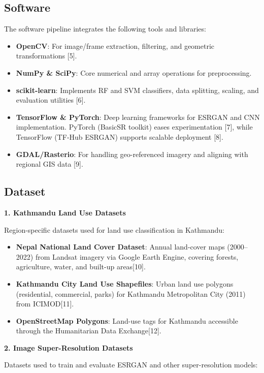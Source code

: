 \subsection{Software}
The software pipeline integrates the following tools and libraries:
\begin{itemize}
  \item \textbf{OpenCV}: For image/frame extraction, filtering, and geometric transformations [5].
  \item \textbf{NumPy \& SciPy}: Core numerical and array operations for preprocessing.
  \item \textbf{scikit-learn}: Implements RF and SVM classifiers, data splitting, scaling, and evaluation utilities [6].
  \item \textbf{TensorFlow \& PyTorch}: Deep learning frameworks for ESRGAN and CNN implementation. PyTorch (BasicSR toolkit) eases experimentation [7], while TensorFlow (TF‑Hub ESRGAN) supports scalable deployment [8].
  \item \textbf{GDAL/Rasterio}: For handling geo-referenced imagery and aligning with regional GIS data [9].
\end{itemize} 


\subsection{Dataset}

\textbf{1. Kathmandu Land Use Datasets}

Region-specific datasets used for land use classification in Kathmandu:

\begin{itemize}
  \item \textbf{Nepal National Land Cover Dataset}: Annual land-cover maps (2000–2022) from Landsat imagery via Google Earth Engine, covering forests, agriculture, water, and built-up areas[10].
  \item \textbf{Kathmandu City Land Use Shapefiles}: Urban land use polygons (residential, commercial, parks) for Kathmandu Metropolitan City (2011) from ICIMOD[11].
  \item \textbf{OpenStreetMap Polygons}: Land-use tags for Kathmandu accessible through the Humanitarian Data Exchange[12].
\end{itemize}

\textbf{2. Image Super-Resolution Datasets}

Datasets used to train and evaluate ESRGAN and other super-resolution models:

